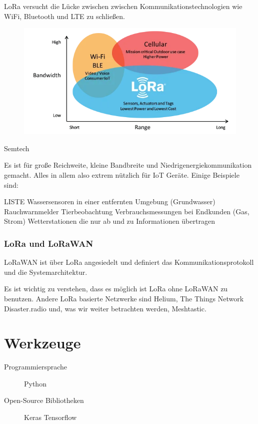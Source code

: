 \documentclass[12pt,a4paper]{article}
\begin{document}
LoRa versucht die Lücke zwischen zwischen Kommunikationstechnologien wie WiFi, Bluetooth und LTE zu schließen.\\
\begin{figure}
	\includegraphics[scale=0.7]{bandwidth-vs-range.png}
\end{figure}

Semtech

Es ist für große Reichweite, kleine Bandbreite und Niedrigenergiekommunikation gemacht. Alles in allem also extrem nützlich für IoT Geräte. Einige Beispiele sind:

LISTE
Wassersensoren in einer entfernten Umgebung (Grundwasser)
Rauchwarnmelder
Tierbeobachtung
Verbrauchsmessungen bei Endkunden (Gas, Strom)
Wetterstationen die nur ab und zu Informationen übertragen

\subsubsection{LoRa und LoRaWAN}

LoRaWAN ist über LoRa angesiedelt und definiert das Kommunikationsprotokoll und die Systemarchitektur.

Es ist wichtig zu verstehen, dass es möglich ist LoRa ohne LoRaWAN zu benutzen. Andere LoRa basierte Netzwerke sind Helium, The Things Network Disaster.radio und, was wir weiter betrachten werden, Meshtastic.




\section{Werkzeuge}
\begin{description}


    \item [Programmiersprache]\tab Python
    \item [Open-Source Bibliotheken]\tab Keras \newline \tab \tab Tensorflow
 
 
\end{description}
\end{document}

